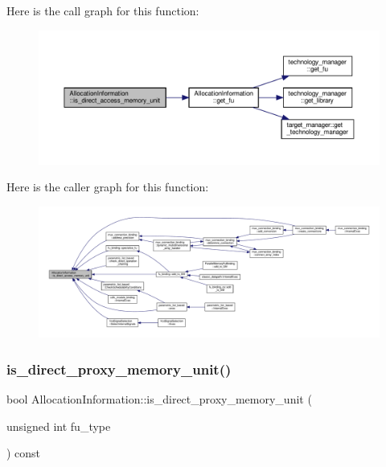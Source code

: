 Here is the call graph for this function\+:
\nopagebreak
\begin{figure}[H]
\begin{center}
\leavevmode
\includegraphics[width=350pt]{d7/d79/classAllocationInformation_a1950658762d7b1febe0131924202ae36_cgraph}
\end{center}
\end{figure}
Here is the caller graph for this function\+:
\nopagebreak
\begin{figure}[H]
\begin{center}
\leavevmode
\includegraphics[width=350pt]{d7/d79/classAllocationInformation_a1950658762d7b1febe0131924202ae36_icgraph}
\end{center}
\end{figure}
\mbox{\label{classAllocationInformation_a7318ac7290c6ddc8f871c98d8817c5c9}} 
\subsubsection{\texorpdfstring{is\+\_\+direct\+\_\+proxy\+\_\+memory\+\_\+unit()}{is\_direct\_proxy\_memory\_unit()}}
{\footnotesize\ttfamily bool Allocation\+Information\+::is\+\_\+direct\+\_\+proxy\+\_\+memory\+\_\+unit (\begin{DoxyParamCaption}\item[{unsigned int}]{fu\+\_\+type }\end{DoxyParamCaption}) const}



